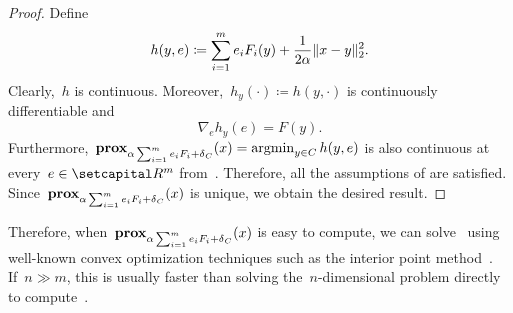 \documentclass[../../main]{subfiles}
\begin{document}
\begin{proof}
    Define
    \begin{equation}
        h(y, e) \coloneqq \sum_{i = 1}^{m} e_i F_i(y) + \frac{1}{2 \alpha} \lVert x - y\rVert_2^2
    .\end{equation} 
    Clearly,~$h$ is continuous.
    Moreover,~$h_y(\cdot) \coloneqq h(y, \cdot)$ is continuously differentiable and
    \begin{equation}
        \nabla_e h_y(e) = F(y)
    .\end{equation} 
    Furthermore,~$\operatorname{\mathbf{prox}}_{\alpha \sum_{i = 1}^{m} e_i F_i + \operatorname{\delta}_C}(x) = \operatorname*{argmin}_{y \in C} h(y, e)$ is also continuous at every~$e \in \setR^m$ from~\cite[Excercise 7.38]{Rockafellar1998}.
    Therefore, all the assumptions of  are satisfied.
    Since~$\operatorname{\mathbf{prox}}_{\alpha \sum_{i = 1}^{m} e_i F_i + \operatorname{\delta}_C}(x)$ is unique, we obtain the desired result.
\end{proof}
Therefore, when~$\operatorname{\mathbf{prox}}_{\alpha \sum_{i = 1}^{m} e_i F_i + \operatorname{\delta}_C}(x)$ is easy to compute, we can solve~ using well-known convex optimization techniques such as the interior point method~\cite{Bertsekas1999}.
If~$n \gg m$, this is usually faster than solving the~$n$-dimensional problem directly to compute~.
\end{document}
